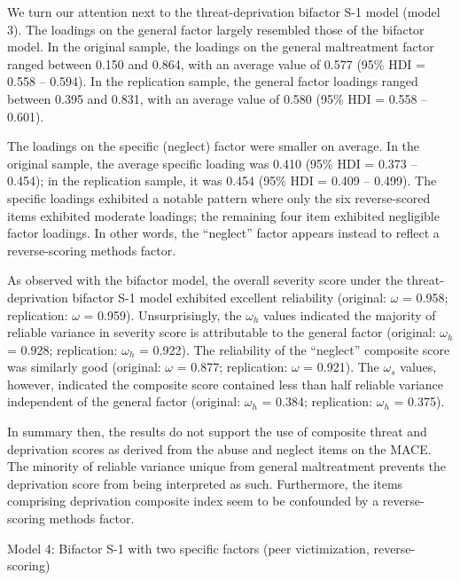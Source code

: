 \documentclass[letterpaper,man,natbib]{apa6}  %
\makeatletter
\renewcommand{\subsubsection}{\@startsection{subsubsection}{3}
  {\z@}%
  {\b@level@two@skip}{\e@level@two@skip}%
  {\normalfont\normalsize\bfseries}}
\makeatother
\begin{document}
We turn our attention next to the threat-deprivation bifactor S-1 model (model 3). The loadings on the general factor largely resembled those of the bifactor model. In the original sample, the loadings on the general maltreatment factor ranged between 0.150 and 0.864, with an average value of 0.577 (95\% HDI = 0.558 -- 0.594). In the replication sample, the general factor loadings ranged between 0.395 and 0.831, with an average value of 0.580 (95\% HDI = 0.558 -- 0.601). 

The loadings on the specific (neglect) factor were smaller on average. In the original sample, the average specific loading was 0.410 (95\% HDI = 0.373 -- 0.454); in the replication sample, it was 0.454 (95\% HDI = 0.409 -- 0.499). The specific loadings exhibited a notable pattern where only the six reverse-scored items exhibited moderate loadings; the remaining four item exhibited negligible factor loadings. In other words, the ``neglect'' factor appears instead to reflect a reverse-scoring methods factor.

As observed with the bifactor model, the overall severity score under the threat- deprivation bifactor S-1 model exhibited excellent reliability (original: $\omega$ = 0.958; replication: $\omega$ = 0.959). Unsurprisingly, the $\omega_h$ values indicated the majority of reliable variance in severity score is attributable to the general factor (original: $\omega_h$ = 0.928; replication: $\omega_h$ = 0.922). The reliability of the ``neglect'' composite score was similarly good (original: $\omega$ = 0.877; replication: $\omega$ = 0.921). The $\omega_s$ values, however, indicated the composite score contained less than half reliable variance independent of the general factor (original: $\omega_h$ = 0.384; replication: $\omega_h$ = 0.375). 

In summary then, the results do not support the use of composite threat and deprivation scores as derived from the abuse and neglect items on the MACE. The minority of reliable variance unique from general maltreatment prevents the deprivation score from being interpreted as such. Furthermore, the items comprising deprivation composite index seem to be confounded by a reverse-scoring methods factor.

\subsubsection{Model 4: Bifactor S-1 with two specific factors (peer victimization, reverse-scoring)}
\end{document}
